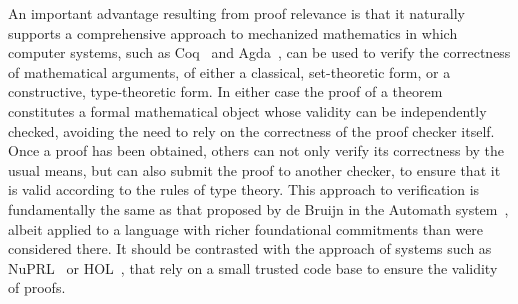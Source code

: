 \documentclass[11pt]{article}
\theoremstyle{remark}
\theoremstyle{definition}
\begin{document}
%
An important advantage resulting from proof relevance is that it naturally 
supports a comprehensive approach to mechanized mathematics in which computer systems, such as Coq~\cite{Coq}
and Agda~\cite{Agda}, can be used to verify the correctness of mathematical arguments, of either a classical, set-theoretic
form, or a constructive, type-theoretic form.  In either case the proof of a theorem constitutes a formal mathematical
object whose validity can be independently checked, avoiding the need to rely on the correctness of the proof checker
itself.  Once a proof has been obtained, others can not only verify its correctness by the usual means, but can also
submit the proof to another checker, to ensure that it is valid according to the rules of type theory. 
This approach to verification is fundamentally the same as that proposed by de Bruijn in the Automath
system~\cite{Automath}, albeit applied to a language with richer foundational commitments than were considered there.
It should be contrasted with the approach of systems such as NuPRL~\cite{NuPRL-Site} or HOL~\cite{HOL,HOL-Light}, that rely
on a small trusted code base to ensure the validity of proofs.
\end{document}
